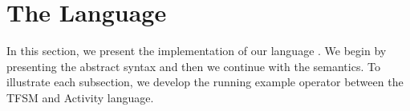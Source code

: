 \section{The Language}
In this section, we present the implementation of our language \bcool. We begin by presenting the abstract syntax and then we continue with the semantics. To illustrate each subsection, we develop the running example operator between the TFSM and Activity language.





